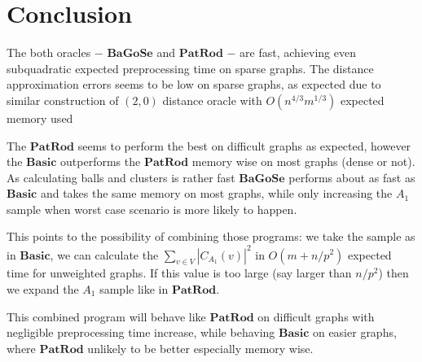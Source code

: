 \documentclass[shortabstract, lic, english]{iithesis}
\theoremstyle{definition} \newtheorem{definition}{Definition}[chapter]
\theoremstyle{remark} \newtheorem{remark}[definition]{Observation}
\theoremstyle{plain} \newtheorem{theorem}[definition]{Theorem}
\theoremstyle{plain} \newtheorem{lemma}[definition]{Lemma}
\theoremstyle{plain} \newtheorem{conjecture}[definition]{Conjecture}
\begin{document}
\section{Conclusion}
The both oracles $-$ $\mathbf{BaGoSe}$ and $\mathbf{PatRod}$ $-$ are fast, achieving even subquadratic expected preprocessing time on sparse graphs.
The distance approximation errors seems to be low on sparse graphs, as expected due to similar construction of $(2,0)$ distance oracle with $O(n^{4/3}m^{1/3})$ expected memory used \cite{21OracleLessMemory}

The $\mathbf{PatRod}$ seems to perform the best on difficult graphs as expected, however the $\mathbf{Basic}$ outperforms the $\mathbf{PatRod}$ memory wise on most graphs (dense or not).
As calculating balls and clusters is rather fast $\mathbf{BaGoSe}$ performs about as fast as $\mathbf{Basic}$ and takes the same memory on most graphs, while only increasing the $A_1$ sample when worst case scenario is more likely to happen.

This points to the possibility of combining those programs:
we take the sample as in $\mathbf{Basic}$, we can calculate the $\sum_{v \in V} |C_{A_1}(v)|^2$ in $O(m + n/p^2)$ expected time for unweighted graphs.
If this value is too large (say larger than $n/p^2$) then we expand the $A_1$ sample like in $\mathbf{PatRod}$.

This combined program will behave like $\mathbf{PatRod}$ on difficult graphs with negligible preprocessing time increase,
while behaving $\mathbf{Basic}$ on easier graphs, where $\mathbf{PatRod}$ unlikely to be better especially memory wise.







\end{document}
